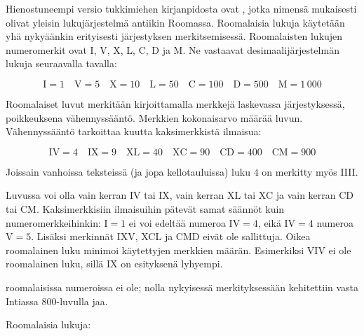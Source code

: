 Hienostuneempi versio tukkimiehen kirjanpidosta ovat , jotka nimensä mukaisesti olivat yleisin lukujärjestelmä antiikin Roomassa. Roomalaisia lukuja käytetään yhä nykyäänkin erityisesti järjestyksen merkitsemisessä. Roomalaisten lukujen numeromerkit ovat I, V, X, L, C, D ja M. Ne vastaavat desimaalijärjestelmän lukuja seuraavalla tavalla:

\begin{equation*}
	\textrm{I}=1\quad
	\textrm{V}=5\quad
	\textrm{X}=10\quad
	\textrm{L}=50\quad
	\textrm{C}=100\quad
	\textrm{D}=500\quad
	\textrm{M}=1\,000
\end{equation*}

Roomalaiset luvut merkitään kirjoittamalla merkkejä laskevassa järjestyksessä, poikkeuksena vähennyssääntö. Merkkien kokonaisarvo määrää luvun. Vähennyssääntö tarkoittaa kuutta kaksimerkkistä ilmaisua:

\begin{equation*}
	\textrm{IV}=4\quad
	\textrm{IX}=9\quad
	\textrm{XL}=40\quad
	\textrm{XC}=90\quad
	\textrm{CD}=400\quad
	\textrm{CM}=900
\end{equation*}

Joissain vanhoissa teksteissä (ja jopa kellotauluissa) luku $4$ on merkitty myös IIII.

Luvussa voi olla vain kerran IV tai IX, vain kerran XL tai XC ja vain kerran CD tai CM. Kaksimerkkisiin ilmaisuihin pätevät samat säännöt kuin numeromerkkeihinkin: I$=1$ ei voi edeltää numeroa IV$=4$, eikä IV$=4$ numeroa V$=5$. Lisäksi merkinnät IXV, XCL ja CMD eivät ole sallittuja. Oikea roomalainen luku minimoi käytettyjen merkkien määrän. Esimerkiksi VIV ei ole roomalainen luku, sillä IX on esityksenä lyhyempi.

 roomalaisissa numeroissa ei ole; nolla nykyisessä merkityksessään kehitettiin vasta Intiassa 800-luvulla jaa.

\begin{esimerkki}
	Roomalaisia lukuja:
\end{esimerkki}

